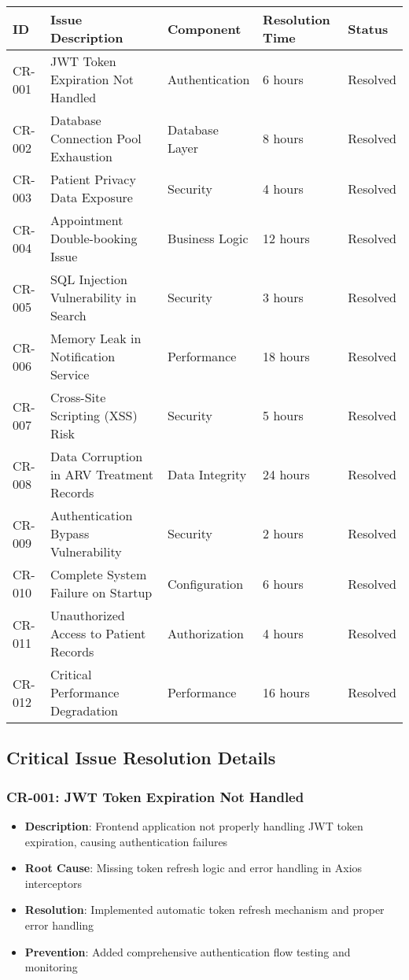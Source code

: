 \documentclass[12pt,a4paper]{article}
\begin{document}
\begin{longtable}{|p{1cm}|p{4cm}|p{3cm}|p{1.5cm}|p{2.5cm}|}
\hline
\textbf{ID} & \textbf{Issue Description} & \textbf{Component} & \textbf{Resolution Time} & \textbf{Status} \\
\hline
CR-001 & JWT Token Expiration Not Handled & Authentication & 6 hours & \cellcolor{green!30}Resolved \\
\hline
CR-002 & Database Connection Pool Exhaustion & Database Layer & 8 hours & \cellcolor{green!30}Resolved \\
\hline
CR-003 & Patient Privacy Data Exposure & Security & 4 hours & \cellcolor{green!30}Resolved \\
\hline
CR-004 & Appointment Double-booking Issue & Business Logic & 12 hours & \cellcolor{green!30}Resolved \\
\hline
CR-005 & SQL Injection Vulnerability in Search & Security & 3 hours & \cellcolor{green!30}Resolved \\
\hline
CR-006 & Memory Leak in Notification Service & Performance & 18 hours & \cellcolor{green!30}Resolved \\
\hline
CR-007 & Cross-Site Scripting (XSS) Risk & Security & 5 hours & \cellcolor{green!30}Resolved \\
\hline
CR-008 & Data Corruption in ARV Treatment Records & Data Integrity & 24 hours & \cellcolor{green!30}Resolved \\
\hline
CR-009 & Authentication Bypass Vulnerability & Security & 2 hours & \cellcolor{green!30}Resolved \\
\hline
CR-010 & Complete System Failure on Startup & Configuration & 6 hours & \cellcolor{green!30}Resolved \\
\hline
CR-011 & Unauthorized Access to Patient Records & Authorization & 4 hours & \cellcolor{green!30}Resolved \\
\hline
CR-012 & Critical Performance Degradation & Performance & 16 hours & \cellcolor{green!30}Resolved \\
\hline
\end{longtable}

\subsection{Critical Issue Resolution Details}

\subsubsection{CR-001: JWT Token Expiration Not Handled}
\begin{itemize}
    \item \textbf{Description}: Frontend application not properly handling JWT token expiration, causing authentication failures
    \item \textbf{Root Cause}: Missing token refresh logic and error handling in Axios interceptors
    \item \textbf{Resolution}: Implemented automatic token refresh mechanism and proper error handling
    \item \textbf{Prevention}: Added comprehensive authentication flow testing and monitoring
\end{itemize}
\end{document}
